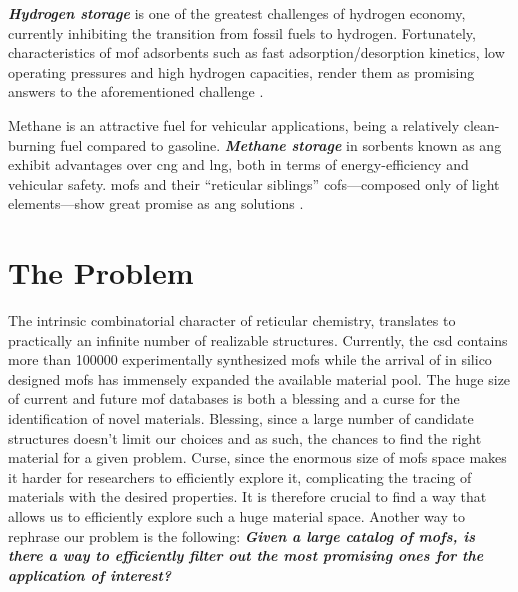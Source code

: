 \emph{\bfseries Hydrogen storage} is one of the greatest
challenges of hydrogen economy, currently inhibiting the transition from fossil
fuels to hydrogen. Fortunately, characteristics of \gls{mof} adsorbents such as
fast adsorption/desorption kinetics, low operating pressures and high hydrogen
capacities, render them as promising answers to the aforementioned challenge
\parencite{Suh2011, Suresh_2021}.

Methane is an attractive fuel for vehicular applications, being a relatively
clean-burning fuel compared to gasoline. \emph{\bfseries Methane
storage} in sorbents known as \gls{ang} exhibit
advantages over \gls{cng} and \gls{lng}, both in terms of energy-efficiency and
vehicular safety. \glspl{mof} \parencite{Ma2007, Spanopoulos_2016,
Tsangarakis2023} and their ``reticular siblings'' \glspl{cof}---composed only of light elements---show great promise as
\gls{ang} solutions \parencite{MendozaCortes2011, Furukawa_2009, Martin2014,
Tong2018}.

\section{The Problem}

The intrinsic combinatorial character of reticular chemistry, translates to
practically an infinite number of realizable structures. Currently, the
\gls{csd} contains more than \num{100000} experimentally synthesized \glspl{mof}
\parencite{siegel29} while the arrival of in silico designed \glspl{mof}
\parencite{siegel36, Rosen2021, Chung2019, chong51, DeVos2023, trillions,
Boyd_2019} has immensely expanded the available material pool. The huge size of
current and future \gls{mof} databases \parencite{trillions} is
both a blessing and a curse for the identification of novel materials. Blessing,
since a large number of candidate structures doesn't limit our choices and as
such, the chances to find the right material for a given problem. Curse, since
the enormous size of \glspl{mof} space makes it harder for researchers to
efficiently explore it, complicating the tracing of materials with the desired
properties. It is therefore crucial to find a way that allows us to efficiently
explore such a huge material space. Another way to rephrase our problem is the
following: \emph{\bfseries Given a large catalog of \glspl{mof}, is there a way
to efficiently filter out the most promising ones for the application of
interest?}

